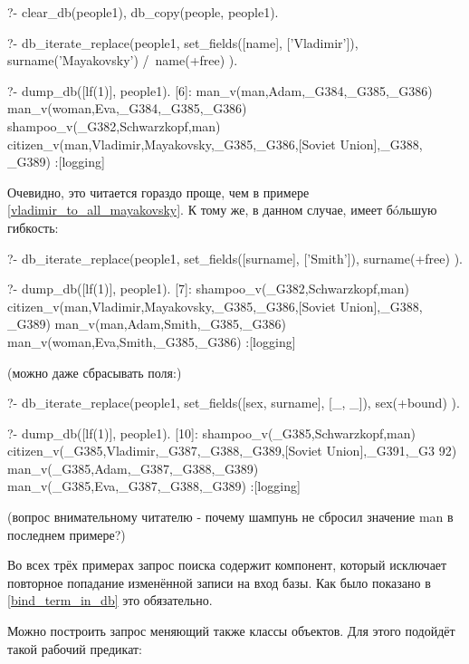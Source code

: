 \documentclass[a4paper]{book}
\begin{document}
\begin{example}{}{}
?- clear_db(people1), db_copy(people, people1).

?- db_iterate_replace(people1, 
      set_fields([name], ['Vladimir']), 
      surname('Mayakovsky') /\ name(+free)
      ).

?- dump_db([lf(1)], people1).
[6]: man_v(man,Adam,_G384,_G385,_G386) 
man_v(woman,Eva,_G384,_G385,_G386) 
shampoo_v(_G382,Schwarzkopf,man) 
citizen_v(man,Vladimir,Mayakovsky,_G385,_G386,[Soviet Union],_G388,
_G389)                                                            
 :[logging]
\end{example}

Очевидно, это читается гораздо проще, чем в примере
\ref{vladimir_to_all_mayakovsky}. К тому же, в данном случае,
имеет б\'oльшую гибкость:

\begin{example}{}{}
?- db_iterate_replace(people1, 
      set_fields([surname], ['Smith']), 
      surname(+free)
   ). 

?- dump_db([lf(1)], people1).
[7]: shampoo_v(_G382,Schwarzkopf,man) 
citizen_v(man,Vladimir,Mayakovsky,_G385,_G386,[Soviet Union],_G388,
_G389)                                                            
man_v(man,Adam,Smith,_G385,_G386) 
man_v(woman,Eva,Smith,_G385,_G386) 
 :[logging]
\end{example}

(можно даже сбрасывать поля:)

\begin{example}{}{}
?- db_iterate_replace(people1, 
      set_fields([sex, surname], [_, _]), 
      sex(+bound)
   ).                                                     

?- dump_db([lf(1)], people1).
[10]: shampoo_v(_G385,Schwarzkopf,man) 
citizen_v(_G385,Vladimir,_G387,_G388,_G389,[Soviet Union],_G391,_G3
92)                                                               
man_v(_G385,Adam,_G387,_G388,_G389) 
man_v(_G385,Eva,_G387,_G388,_G389) 
 :[logging]
\end{example}

(вопрос внимательному читателю - почему шампунь не сбросил
значение man в последнем примере?)

Во всех трёх примерах запрос поиска содержит компонент, который
исключает повторное попадание изменённой записи на вход базы. Как
было показано в \ref{bind_term_in_db} это обязательно.

Можно построить запрос меняющий также классы объектов. Для этого
подойдёт такой рабочий предикат:
\end{document}
